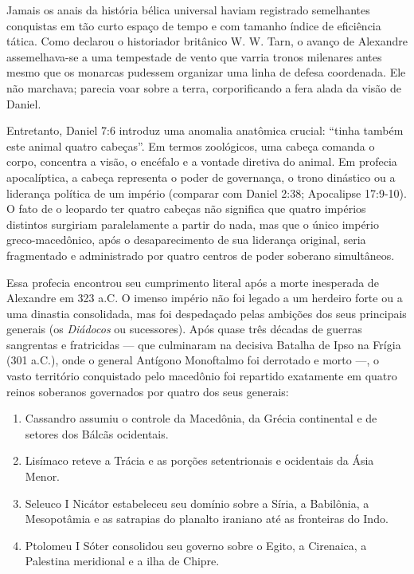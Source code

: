 Jamais os anais da história bélica universal haviam registrado semelhantes conquistas em tão curto espaço de tempo e com tamanho índice de eficiência tática. Como declarou o historiador britânico W. W. Tarn, o avanço de Alexandre assemelhava-se a uma tempestade de vento que varria tronos milenares antes mesmo que os monarcas pudessem organizar uma linha de defesa coordenada. Ele não marchava; parecia voar sobre a terra, corporificando a fera alada da visão de Daniel.

Entretanto, Daniel 7:6 introduz uma anomalia anatômica crucial: ``tinha também este animal quatro cabeças''.
Em termos zoológicos, uma cabeça comanda o corpo, concentra a visão, o encéfalo e a vontade diretiva do animal. Em profecia apocalíptica, a cabeça representa o poder de governança, o trono dinástico ou a liderança política de um império (comparar com Daniel 2:38; Apocalipse 17:9-10). O fato de o leopardo ter quatro cabeças não significa que quatro impérios distintos surgiriam paralelamente a partir do nada, mas que o único império greco-macedônico, após o desaparecimento de sua liderança original, seria fragmentado e administrado por quatro centros de poder soberano simultâneos.

Essa profecia encontrou seu cumprimento literal após a morte inesperada de Alexandre em 323 a.C. O imenso império não foi legado a um herdeiro forte ou a uma dinastia consolidada, mas foi despedaçado pelas ambições dos seus principais generais (os \textit{Diádocos} ou sucessores). Após quase três décadas de guerras sangrentas e fratricidas — que culminaram na decisiva Batalha de Ipso na Frígia (301 a.C.), onde o general Antígono Monoftalmo foi derrotado e morto —, o vasto território conquistado pelo macedônio foi repartido exatamente em quatro reinos soberanos governados por quatro dos seus generais:
\begin{enumerate}
  \item Cassandro assumiu o controle da Macedônia, da Grécia continental e de setores dos Bálcãs ocidentais.
  \item Lisímaco reteve a Trácia e as porções setentrionais e ocidentais da Ásia Menor.
  \item Seleuco I Nicátor estabeleceu seu domínio sobre a Síria, a Babilônia, a Mesopotâmia e as satrapias do planalto iraniano até as fronteiras do Indo.
  \item Ptolomeu I Sóter consolidou seu governo sobre o Egito, a Cirenaica, a Palestina meridional e a ilha de Chipre.
\end{enumerate}


